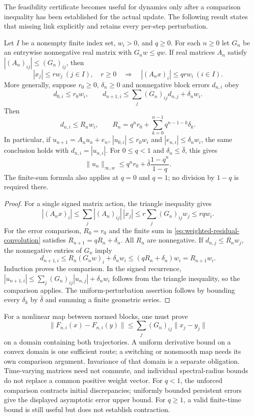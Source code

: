 The feasibility certificate becomes useful for dynamics only after a
comparison inequality has been established for the actual update. The
following result states that missing link explicitly and retains every
per-step perturbation.

\begin{theorem}
\label{thm:weighted-gain-propagation}
Let $I$ be a nonempty finite index set, $w_i>0$, and $q\ge0$.
For each $n\ge0$ let $G_n$ be an entrywise nonnegative real matrix with
$G_nw\le qw$.
If real matrices $A_n$ satisfy $|(A_n)_{ij}|\le (G_n)_{ij}$, then
\[
 |x_j|\le rw_j\ (j\in I),\quad r\ge0
 \quad\Longrightarrow\quad
 |(A_nx)_i|\le qr w_i\ (i\in I).
\]
More generally, suppose $r_0\ge0$, $\delta_n\ge0$ and nonnegative block
errors $d_{n,i}$ obey
\[
 d_{0,i}\le r_0w_i,\qquad
 d_{n+1,i}\le\sum_j(G_n)_{ij}d_{n,j}+\delta_nw_i.
\]
Then
\begin{equation}\label{eq:weighted-residual-convolution}
 d_{n,i}\le R_nw_i,\qquad
 R_n=q^nr_0+\sum_{k=0}^{n-1}q^{n-1-k}\delta_k.
\end{equation}
In particular, if $u_{n+1}=A_nu_n+e_n$,
$|u_{0,i}|\le r_0w_i$ and $|e_{n,i}|\le\delta_nw_i$, the same
conclusion holds with $d_{n,i}=|u_{n,i}|$. For
$0\le q<1$ and $\delta_n\le\bar\delta$, this gives
\[
 \|u_n\|_{\infty,w}
 \le q^nr_0+\bar\delta\frac{1-q^n}{1-q}.
\]
The finite-sum formula also applies at $q=0$ and $q=1$; no division by
$1-q$ is required there.
\end{theorem}
\begin{proof}
For a single signed matrix action, the triangle inequality gives
\[
 |(A_nx)_i|
 \le\sum_j |(A_n)_{ij}|\,|x_j|
 \le r\sum_j(G_n)_{ij}w_j
 \le rq w_i.
\]
For the error comparison, $R_0=r_0$ and the finite sum in
\eqref{eq:weighted-residual-convolution} satisfies
$R_{n+1}=qR_n+\delta_n$. All $R_n$ are nonnegative. If
$d_{n,j}\le R_nw_j$, the nonnegative entries of $G_n$ imply
\[
 d_{n+1,i}\le R_n(G_nw)_i+\delta_nw_i
 \le(qR_n+\delta_n)w_i=R_{n+1}w_i.
\]
Induction proves the comparison. In the signed recurrence,
$|u_{n+1,i}|\le\sum_j(G_n)_{ij}|u_{n,j}|+\delta_nw_i$
follows from the triangle inequality, so the comparison applies.
The uniform-perturbation assertion follows by bounding every
$\delta_k$ by $\bar\delta$ and summing a finite geometric series.
\end{proof}

For a nonlinear map between normed blocks, one must prove
\[
 \|F_{n,i}(x)-F_{n,i}(y)\|
 \le\sum_j(G_n)_{ij}\|x_j-y_j\|
\]
on a domain containing both trajectories. A uniform derivative bound on a
convex domain is one sufficient route; a switching or nonsmooth map needs
its own comparison argument. Invariance of that domain is a separate
obligation. Time-varying matrices need not commute, and individual
spectral-radius bounds do not replace a common positive weight vector.
For $q<1$, the unforced comparison contracts initial discrepancies;
uniformly bounded persistent errors give the displayed asymptotic error
upper bound. For $q\ge1$, a valid
finite-time bound is still useful but does not establish contraction.

